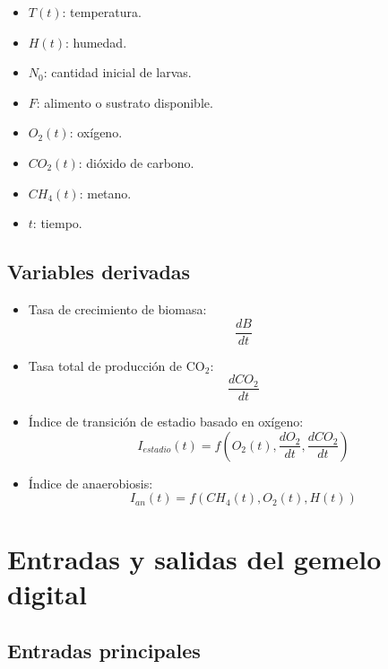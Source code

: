 \documentclass[12pt,a4paper]{report}
\begin{document}
\begin{itemize}[leftmargin=0.7cm]
    \item \(T(t)\): temperatura.
    \item \(H(t)\): humedad.
    \item \(N_0\): cantidad inicial de larvas.
    \item \(F\): alimento o sustrato disponible.
    \item \(O_2(t)\): oxígeno.
    \item \(CO_2(t)\): dióxido de carbono.
    \item \(CH_4(t)\): metano.
    \item \(t\): tiempo.
\end{itemize}

\section{Variables derivadas}

\begin{itemize}[leftmargin=0.7cm]
    \item Tasa de crecimiento de biomasa:
    \begin{equation}
        \frac{dB}{dt}
    \end{equation}
    \item Tasa total de producción de CO$_2$:
    \begin{equation}
        \frac{dCO_2}{dt}
    \end{equation}
    \item Índice de transición de estadio basado en oxígeno:
    \begin{equation}
        I_{estadio}(t) = f(O_2(t), \frac{dO_2}{dt}, \frac{dCO_2}{dt})
    \end{equation}
    \item Índice de anaerobiosis:
    \begin{equation}
        I_{an}(t) = f(CH_4(t), O_2(t), H(t))
    \end{equation}
\end{itemize}

\chapter{Entradas y salidas del gemelo digital}

\section{Entradas principales}
\end{document}
